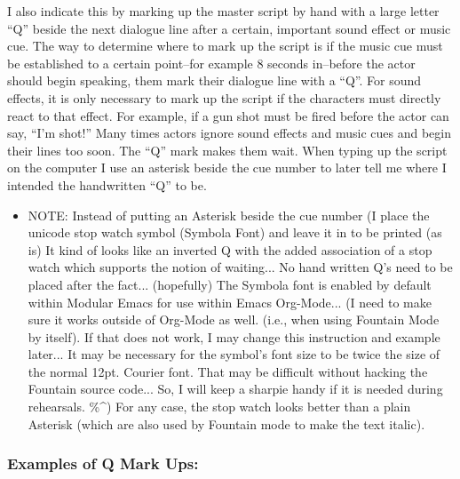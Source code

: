 \documentclass[openleft,oneside,showtrims]{memoir}
\begin{document}
I also indicate this by marking up the master script by hand with a large letter ``Q'' beside the next dialogue line after a certain, important sound effect or music cue. The way to determine where to mark up the script is if the music cue must be established to a certain point--for example 8 seconds in--before the actor should begin speaking, them mark their dialogue line with a ``Q''. For sound effects, it is only necessary to mark up the script if the characters must directly react to that effect. For example, if a gun shot must be fired before the actor can say, ``I'm shot!'' Many times actors ignore sound effects and music cues and begin their lines too soon. The ``Q'' mark makes them wait. When typing up the script on the computer I use an asterisk beside the cue number to later tell me where I intended the handwritten ``Q'' to be.

\begin{itemize}
\item NOTE: Instead of putting an Asterisk beside the cue number (I place the unicode stop watch symbol (Symbola Font) and leave it in to be printed (as is) It kind of looks like an inverted Q with the added association of a stop watch which supports the notion of waiting... No hand written Q's need to be placed after the fact... (hopefully) The Symbola font is enabled by default within Modular Emacs for use within Emacs Org-Mode... (I need to make sure it works outside of Org-Mode as well. (i.e., when using Fountain Mode by itself). If that does not work, I may change this instruction and example later... It may be necessary for the symbol's font size to be twice the size of the normal 12pt. Courier font. That may be difficult without hacking the Fountain source code... So, I will keep a sharpie handy if it is needed during rehearsals. \%\^{}) For any case, the stop watch looks better than a plain Asterisk (which are also used by Fountain mode to make the text italic).
\end{itemize}

\subsubsection*{Examples of Q Mark Ups:}
\label{sec:org33b3f09}
\end{document}
